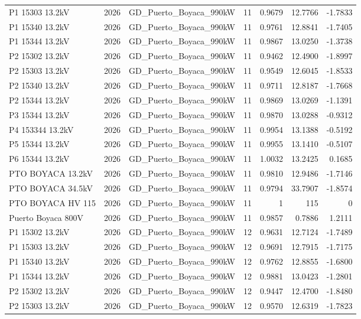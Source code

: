 \documentclass[11pt,a4paper]{article}
\begin{document}
\begin{longtable}{llllrrr}
P1 15303 13.2kV & 2026 & GD\_Puerto\_Boyaca\_990kW & 11 & 0.9679 & 12.7766 & -1.7833 \\
P1 15340 13.2kV & 2026 & GD\_Puerto\_Boyaca\_990kW & 11 & 0.9761 & 12.8841 & -1.7405 \\
P1 15344 13.2kV & 2026 & GD\_Puerto\_Boyaca\_990kW & 11 & 0.9867 & 13.0250 & -1.3738 \\
P2 15302 13.2kV & 2026 & GD\_Puerto\_Boyaca\_990kW & 11 & 0.9462 & 12.4900 & -1.8997 \\
P2 15303 13.2kV & 2026 & GD\_Puerto\_Boyaca\_990kW & 11 & 0.9549 & 12.6045 & -1.8533 \\
P2 15340 13.2kV & 2026 & GD\_Puerto\_Boyaca\_990kW & 11 & 0.9711 & 12.8187 & -1.7668 \\
P2 15344 13.2kV & 2026 & GD\_Puerto\_Boyaca\_990kW & 11 & 0.9869 & 13.0269 & -1.1391 \\
P3 15344 13.2kV & 2026 & GD\_Puerto\_Boyaca\_990kW & 11 & 0.9870 & 13.0288 & -0.9312 \\
P4 153344 13.2kV & 2026 & GD\_Puerto\_Boyaca\_990kW & 11 & 0.9954 & 13.1388 & -0.5192 \\
P5 15344 13.2kV & 2026 & GD\_Puerto\_Boyaca\_990kW & 11 & 0.9955 & 13.1410 & -0.5107 \\
P6 15344 13.2kV & 2026 & GD\_Puerto\_Boyaca\_990kW & 11 & 1.0032 & 13.2425 & 0.1685 \\
PTO BOYACA 13.2kV & 2026 & GD\_Puerto\_Boyaca\_990kW & 11 & 0.9810 & 12.9486 & -1.7146 \\
PTO BOYACA 34.5kV & 2026 & GD\_Puerto\_Boyaca\_990kW & 11 & 0.9794 & 33.7907 & -1.8574 \\
PTO BOYACA HV 115 & 2026 & GD\_Puerto\_Boyaca\_990kW & 11 & 1 & 115 & 0 \\
Puerto Boyaca 800V & 2026 & GD\_Puerto\_Boyaca\_990kW & 11 & 0.9857 & 0.7886 & 1.2111 \\
P1 15302 13.2kV & 2026 & GD\_Puerto\_Boyaca\_990kW & 12 & 0.9631 & 12.7124 & -1.7489 \\
P1 15303 13.2kV & 2026 & GD\_Puerto\_Boyaca\_990kW & 12 & 0.9691 & 12.7915 & -1.7175 \\
P1 15340 13.2kV & 2026 & GD\_Puerto\_Boyaca\_990kW & 12 & 0.9762 & 12.8855 & -1.6800 \\
P1 15344 13.2kV & 2026 & GD\_Puerto\_Boyaca\_990kW & 12 & 0.9881 & 13.0423 & -1.2801 \\
P2 15302 13.2kV & 2026 & GD\_Puerto\_Boyaca\_990kW & 12 & 0.9447 & 12.4700 & -1.8480 \\
P2 15303 13.2kV & 2026 & GD\_Puerto\_Boyaca\_990kW & 12 & 0.9570 & 12.6319 & -1.7823 \\

\end{longtable}
\end{document}
